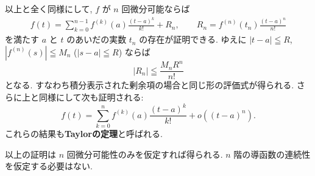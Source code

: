 \documentclass[12pt,twoside]{jarticle}
\theoremstyle{jplain}
\theoremstyle{jplain}
\theoremstyle{jplain}
\numberwithin{theorem}{section}
\numberwithin{equation}{section}
\numberwithin{figure}{section}
\numberwithin{table}{section}
\begin{document}
以上と全く同様にして, $f$ が $n$ 回微分可能ならば
\begin{align*}
f(t)=
\sum_{k=0}^{n-1} f^{(k)}(a)\frac{(t-a)^k}{k!}
+R_n,
\qquad
R_n = f^{(n)}(t_n)\frac{(t-a)^n}{n!}
\end{align*}
を満たす $a$ と $t$ のあいだの実数 $t_n$ の存在が証明できる.
ゆえに $|t-a|\leqq R$, $|f^{(n)}(s)|\leqq M_n$ ($|s-a|\leqq R$) ならば
\[
|R_n| \leqq \frac{M_n R^n}{n!} 
\]
となる. すなわち積分表示された剰余項の場合と同じ形の評価式が得られる.
さらに上と同様にして次も証明される:
\[
f(t) = \sum_{k=0}^n f^{(k)}(a)\frac{(t-a)^k}{k!} + o((t-a)^n).
\]
これらの結果も{\bf Taylorの定理}と呼ばれる.

以上の証明は $n$ 回微分可能性のみを仮定すれば得られる.
$n$ 階の導函数の連続性を仮定する必要はない.

\end{document}
